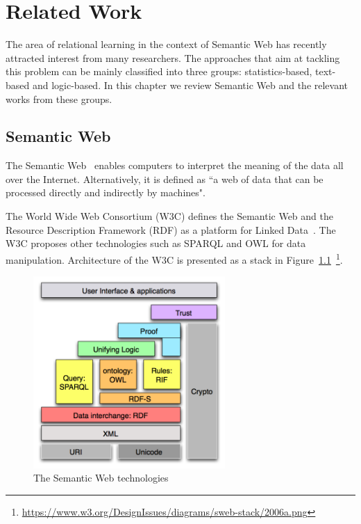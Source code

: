 \chapter{Related Work}
\label{chap:relwork}

The area of relational learning in the context of Semantic Web has recently attracted interest from many researchers. The approaches that aim at tackling this problem can be mainly classified into three groups: statistics-based, text-based and logic-based. In this chapter we review Semantic Web and the relevant works from these groups.

\section{Semantic Web}

The Semantic Web~\cite{ref26} enables computers to interpret the meaning of the data all over the Internet. Alternatively, it is defined as ``a web of data that can be processed directly and indirectly by machines".

The World Wide Web Consortium (W3C) defines the Semantic Web and the Resource Description Framework (RDF) as a platform for Linked Data~\cite{ref26}. The W3C proposes other technologies such as SPARQL and OWL for data manipulation. Architecture of the W3C is presented as a stack in Figure~\ref{fig1}~\footnote{\url{https://www.w3.org/DesignIssues/diagrams/sweb-stack/2006a.png}}.

\begin{figure}
\centering
\includegraphics[width=0.65\textwidth]{figures/semantic_web.png}
\caption{The Semantic Web technologies}
\label{fig1}
\end{figure}

